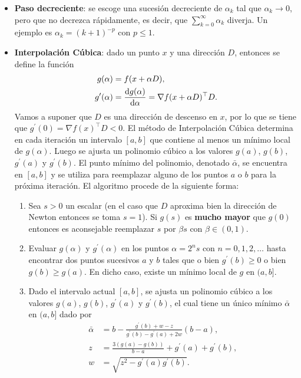 \begin{itemize}
	\item \textbf{Paso decreciente}: se escoge una sucesión decreciente de \(\alpha_k\) tal que \(\alpha_k \to 0\), pero que no decrezca rápidamente, es decir, que \(\sum_{k=0}^{\infty} \alpha_k\) diverja. Un ejemplo es \(\alpha_k = (k+1)^{-p}\) con \(p \leq 1\).
	
	\item \textbf{Interpolación Cúbica}: dado un punto \(x\) y una dirección \(D\), entonces se define la función
	\begin{align*}
	g(\alpha)			&= f(x + \alpha D),\\
	g^{\prime}(\alpha)	&= \dv{g(\alpha)}{\alpha} = \nabla f(x + \alpha D)^{\top} D.
	\end{align*}
	Vamos a suponer que \(D\) es una dirección de descenso en \(x\), por lo que se tiene que \(g^{\prime}(0) = \nabla f(x)^{\top} D < 0\). El método de Interpolación Cúbica determina en cada iteración un intervalo \([a, b]\) que contiene al menos un mínimo local de \(g(\alpha)\). Luego se ajusta un polinomio cúbico a los valores \(g(a)\), \(g(b)\), \(g^{\prime}(a)\) y \(g^{\prime}(b)\). El punto mínimo del polinomio, denotado \(\bar{\alpha}\), se encuentra en \([a, b]\) y se utiliza para reemplazar alguno de los puntos \(a\) o \(b\) para la próxima iteración. El algoritmo procede de la siguiente forma:
	
	\begin{enumerate}
		\item Sea \(s > 0\) un escalar (en el caso que \(D\) aproxima bien la dirección de Newton entonces se toma \(s = 1\)). Si \(g(s)\) es \textbf{mucho mayor} que \(g(0)\) entonces es aconsejable reemplazar \(s\) por \(\beta s\) con \(\beta \in (0,1)\).
		
		\item Evaluar \(g(\alpha)\) y \(g^{\prime}(\alpha)\) en los puntos \(\alpha = 2^n s\) con \(n=0, 1, 2, \dotsc\) hasta encontrar dos puntos sucesivos \(a\) y \(b\) tales que o bien \(g^{\prime}(b) \geq 0\) o bien \(g(b) \geq g(a)\). En dicho caso, existe un mínimo local de \(g\) en \((a, b]\).
		
		\item Dado el intervalo actual \([a, b]\), se ajusta un polinomio cúbico a los valores \(g(a)\), \(g(b)\), \(g^{\prime}(a)\) y \(g^{\prime}(b)\), el cual tiene un único mínimo \(\bar{\alpha}\) en \((a,b]\) dado por
		\begin{align*}
		\bar{\alpha}	&= b - \frac{g^{\prime}(b) + w - z}{g^{\prime}(b) - g^{\prime}(a) + 2w}(b - a),\\
		z				&= \frac{3(g(a) - g(b))}{b - a} + g^{\prime}(a) + g^{\prime}(b),\\
		w				&= \sqrt{z^{2} - g^{\prime}(a) g^{\prime}(b)}.
		\end{align*}
		

\end{enumerate}
\end{itemize}

